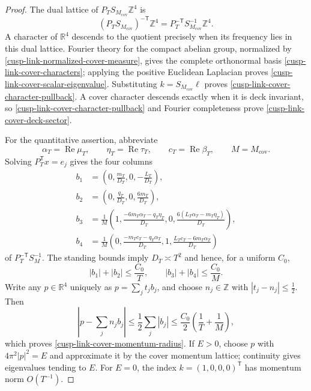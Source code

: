 \documentclass[11pt]{article}
\theoremstyle{definition}
\numberwithin{equation}{section}
\begin{document}
\begin{proof}
The dual lattice of
\(P_TS_{M_{\mathrm{cov}}}\mathbb Z^4\) is
\begin{equation}
 (P_TS_{M_{\mathrm{cov}}})^{-\mathsf T}\mathbb Z^4
 =P_T^{-\mathsf T}S_{M_{\mathrm{cov}}}^{-1}\mathbb Z^4.
 \label{cusp-link-cover-dual-lattice}
\end{equation}
A character of \(\mathbb R^4\) descends to the quotient precisely when its
frequency lies in this dual lattice.  Fourier theory for the compact abelian
group, normalized by \eqref{cusp-link-normalized-cover-measure}, gives the
complete orthonormal basis \eqref{cusp-link-cover-characters}; applying the
positive Euclidean Laplacian proves
\eqref{cusp-link-cover-scalar-eigenvalue}.  Substituting
\(k=S_{M_{\mathrm{cov}}}\ell\) proves
\eqref{cusp-link-cover-character-pullback}.  A cover character descends
exactly when it is deck invariant, so
\eqref{cusp-link-cover-character-pullback} and Fourier completeness prove
\eqref{cusp-link-cover-deck-sector}.

For the quantitative assertion, abbreviate
\[
 \alpha_T=\operatorname{Re}\mu_T,\qquad
 \eta_T=\operatorname{Re}\tau_T,\qquad
 c_T=\operatorname{Re}\beta_T,\qquad M=M_{\mathrm{cov}}.
\]
Solving \(P_T^{\mathsf T}x=e_j\) gives the four columns
\begin{align*}
 b_1&=\left(0,\frac{m_T}{D_T},0,-\frac{L_T}{D_T}\right),\\
 b_2&=\left(0,\frac{q_T}{D_T},0,\frac{6m_T}{D_T}\right),\\
 b_3&=\frac1M\left(
 1,\frac{-6m_T\alpha_T-q_T\eta_T}{D_T},0,
 \frac{6(L_T\alpha_T-m_T\eta_T)}{D_T}\right),\\
 b_4&=\frac1M\left(
 0,\frac{-m_Tc_T-q_T\alpha_T}{D_T},1,
 \frac{L_Tc_T-6m_T\alpha_T}{D_T}\right)
\end{align*}
of \(P_T^{-\mathsf T}S_M^{-1}\).  The standing bounds imply
\(D_T\asymp T^2\) and hence, for a uniform \(C_0\),
\[
 |b_1|+|b_2|\le \frac{C_0}{T},
 \qquad |b_3|+|b_4|\le \frac{C_0}{M}.
\]
Write any \(p\in\mathbb R^4\) uniquely as \(p=\sum_jt_jb_j\), and choose
\(n_j\in\mathbb Z\) with \(|t_j-n_j|\le\tfrac12\).  Then
\[
 \left|p-\sum_jn_jb_j\right|
 \le\frac12\sum_j|b_j|
 \le\frac{C_0}{2}\left(\frac1T+\frac1M\right),
\]
which proves \eqref{cusp-link-cover-momentum-radius}.  If \(E>0\), choose
\(p\) with \(4\pi^2|p|^2=E\) and approximate it by the cover momentum
lattice; continuity gives eigenvalues tending to \(E\).  For \(E=0\), the
index \(k=(1,0,0,0)^{\mathsf T}\) has momentum norm \(O(T^{-1})\).
\end{proof}
\end{document}
